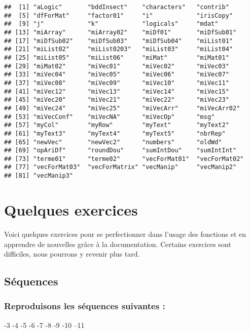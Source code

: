 \documentclass[]{book}
\theoremstyle{definition}
\theoremstyle{definition}
\theoremstyle{definition}
\theoremstyle{remark}
\begin{document}
\begin{verbatim}
##  [1] "aLogic"       "bddInsect"    "characters"   "contrib"     
##  [5] "dfForMat"     "factor01"     "i"            "irisCopy"    
##  [9] "j"            "k"            "logicals"     "mdat"        
## [13] "miArray"      "miArray02"    "miDf01"       "miDfSub01"   
## [17] "miDfSub02"    "miDfSub03"    "miDfSub04"    "miList01"    
## [21] "miList02"     "miList0203"   "miList03"     "miList04"    
## [25] "miList05"     "miList06"     "miMat"        "miMat01"     
## [29] "miMat02"      "miVec01"      "miVec02"      "miVec03"     
## [33] "miVec04"      "miVec05"      "miVec06"      "miVec07"     
## [37] "miVec08"      "miVec09"      "miVec10"      "miVec11"     
## [41] "miVec12"      "miVec13"      "miVec14"      "miVec15"     
## [45] "miVec20"      "miVec21"      "miVec22"      "miVec23"     
## [49] "miVec24"      "miVec25"      "miVecArr"     "miVecArr02"  
## [53] "miVecConf"    "miVecNA"      "miVecOp"      "msg"         
## [57] "myCol"        "myRow"        "myText"       "myText2"     
## [61] "myText3"      "myText4"      "myText5"      "nbrRep"      
## [65] "newVec"       "newVec2"      "numbers"      "oldWd"       
## [69] "opAriDf"      "roundDou"     "sumIntDou"    "sumIntInt"   
## [73] "terme01"      "terme02"      "vecForMat01"  "vecForMat02" 
## [77] "vecForMat03"  "vecForMatrix" "vecManip"     "vecManip2"   
## [81] "vecManip3"
\end{verbatim}

\section{Quelques exercices}\label{quelques-exercices}

Voici quelques exercices pour se perfectionner dans l'usage des
fonctions et en apprendre de nouvelles grâce à la documentation.
Certains exercices sont difficiles, nous pourrons y revenir plus tard.

\subsection{Séquences}\label{sequences}

\subsubsection{Reproduisons les séquences suivantes
:}\label{reproduisons-les-sequences-suivantes}

-3 -4 -5 -6 -7 -8 -9 -10 --11
\end{document}
